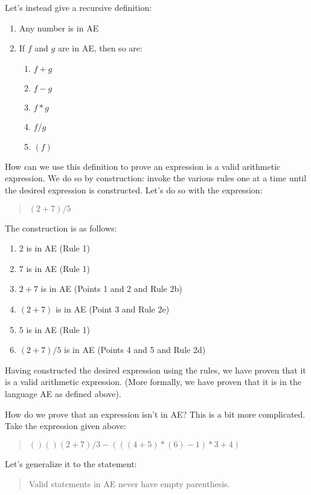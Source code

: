 \documentclass[letterpaper,12pt,openany,reqno]{book}%
\begin{document}
Let's instead give a recursive definition:

\begin{enumerate}
\item Any number is in AE
\item If $f$ and $g$ are in AE, then so are:
\begin{enumerate}
\item $f + g$
\item $f - g$
\item $f * g$
\item $f / g$
\item $(f)$
\end{enumerate}
\end{enumerate}

How can we use this definition to prove an expression is a valid arithmetic expression. We do so by construction: invoke the various rules one at a time until the desired expression is constructed. Let's do so with the expression:
\begin{quote}
$(2+7)/5$
\end{quote}
The construction is as follows:
\begin{enumerate}
\item $2$ is in AE (Rule 1)
\item $7$ is in AE (Rule 1)
\item $2+7$ is in AE (Points 1 and 2 and Rule 2b)
\item $(2+7)$ is in AE (Point 3 and Rule 2e)
\item $5$ is in AE (Rule 1)
\item $(2+7)/5$ is in AE (Points 4 and 5 and Rule 2d)
\end{enumerate}
Having constructed the desired expression using the rules, we have proven that it is a valid arithmetic expression. (More formally, we have proven that it is in the language AE as defined above).

How do we prove that an expression isn't in AE? This is a bit more complicated. Take the expression given above:
\begin{quote}
$()()(2+7)/3-(((4+5)*(6)-1)*3 + 4)$
\end{quote}
Let's generalize it to the statement:
\begin{quote}
Valid statements in AE never have empty parenthesis.
\end{quote}
\end{document}
